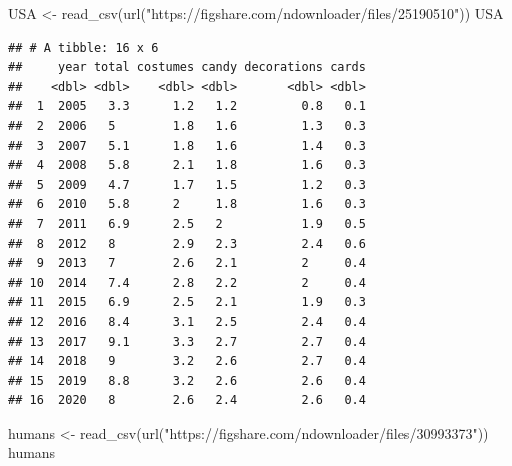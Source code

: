 \documentclass[
]{book}
\newenvironment{Shaded}{\begin{snugshade}}{\end{snugshade}}
\newcommand{\FunctionTok}[1]{\textcolor[rgb]{0.00,0.00,0.00}{#1}}
\newcommand{\NormalTok}[1]{#1}
\newcommand{\OtherTok}[1]{\textcolor[rgb]{0.56,0.35,0.01}{#1}}
\newcommand{\StringTok}[1]{\textcolor[rgb]{0.31,0.60,0.02}{#1}}
\begin{document}
\begin{Shaded}
\begin{Highlighting}[]
\NormalTok{USA }\OtherTok{\textless{}{-}} \FunctionTok{read\_csv}\NormalTok{(}\FunctionTok{url}\NormalTok{(}\StringTok{"https://figshare.com/ndownloader/files/25190510"}\NormalTok{))}
\NormalTok{USA}
\end{Highlighting}
\end{Shaded}

\begin{verbatim}
## # A tibble: 16 x 6
##     year total costumes candy decorations cards
##    <dbl> <dbl>    <dbl> <dbl>       <dbl> <dbl>
##  1  2005   3.3      1.2   1.2         0.8   0.1
##  2  2006   5        1.8   1.6         1.3   0.3
##  3  2007   5.1      1.8   1.6         1.4   0.3
##  4  2008   5.8      2.1   1.8         1.6   0.3
##  5  2009   4.7      1.7   1.5         1.2   0.3
##  6  2010   5.8      2     1.8         1.6   0.3
##  7  2011   6.9      2.5   2           1.9   0.5
##  8  2012   8        2.9   2.3         2.4   0.6
##  9  2013   7        2.6   2.1         2     0.4
## 10  2014   7.4      2.8   2.2         2     0.4
## 11  2015   6.9      2.5   2.1         1.9   0.3
## 12  2016   8.4      3.1   2.5         2.4   0.4
## 13  2017   9.1      3.3   2.7         2.7   0.4
## 14  2018   9        3.2   2.6         2.7   0.4
## 15  2019   8.8      3.2   2.6         2.6   0.4
## 16  2020   8        2.6   2.4         2.6   0.4
\end{verbatim}

\begin{Shaded}
\begin{Highlighting}[]
\NormalTok{humans }\OtherTok{\textless{}{-}} \FunctionTok{read\_csv}\NormalTok{(}\FunctionTok{url}\NormalTok{(}\StringTok{"https://figshare.com/ndownloader/files/30993373"}\NormalTok{))}
\NormalTok{humans}
\end{Highlighting}
\end{Shaded}
\end{document}
